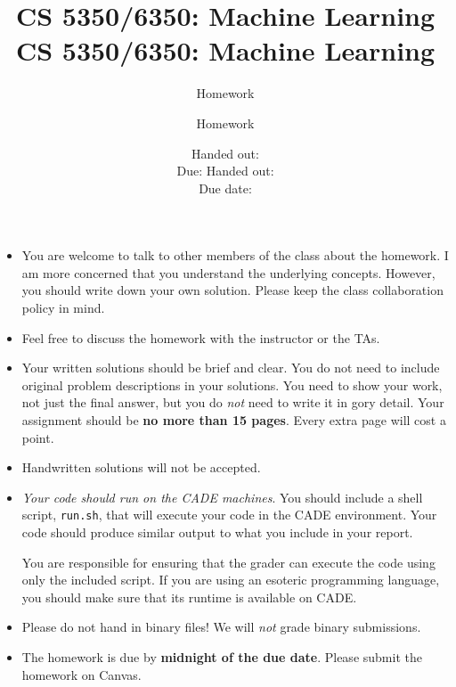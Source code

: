 \documentclass[12pt, fullpage,letterpaper]{article}
\title{CS 5350/6350: Machine Learning \semester}
\author{Homework \assignmentId}
\date{Handed out: \releaseDate\\
	Due: \dueDate}
\title{CS 5350/6350: Machine Learning \semester}
\author{Homework \assignmentId}
\date{Handed out: \releaseDate\\
  Due date: \dueDate}
\begin{document}
\maketitle


{\footnotesize
	\begin{itemize}
		\item You are welcome to talk to other members of the class about
		the homework. I am more concerned that you understand the
		underlying concepts. However, you should write down your own
		solution. Please keep the class collaboration policy in mind.
		
		\item Feel free to discuss the homework with the instructor or the TAs.
		
		\item Your written solutions should be brief and clear. You do not need to include original problem descriptions in your solutions. You need to
		show your work, not just the final answer, but you do \emph{not}
		need to write it in gory detail. Your assignment should be {\bf no
			more than 15 pages}. Every extra page will cost a point.
		
		\item Handwritten solutions will not be accepted.
		
		
		\item {\em Your code should run on the CADE machines}. You should
		include a shell script, {\tt run.sh}, that will execute your code
		in the CADE environment. Your code should produce similar output
		to what you include in your report.
		
		You are responsible for ensuring that the grader can execute the
		code using only the included script. If you are using an
		esoteric programming language, you should make sure that its
		runtime is available on CADE.
		
		\item Please do not hand in binary files! We will {\em not} grade
		binary submissions.
		
		\item The homework is due by \textbf{midnight of the due date}. Please submit
		the homework on Canvas.
		
	\end{itemize}
}
\end{document}

